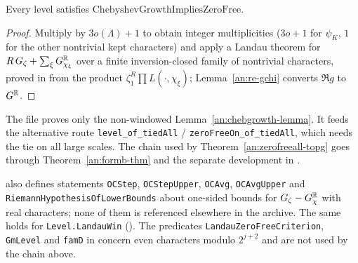 \begin{lemma}\label{an:chebgrowth-lemma}
Every level satisfies $\mathrm{ChebyshevGrowthImpliesZeroFree}$.
\end{lemma}
\begin{proof}
Multiply by $3o(\Lambda)+1$ to obtain integer multiplicities ($3o+1$ for
$\psi_K$, $1$ for the other nontrivial kept characters) and apply a
Landau theorem for $R\,G_{\zeta}+\sum_{\xi} G^{\mathbb{R}}_{\chi_{\xi}}$ over a finite
inversion-closed family of nontrivial characters, proved in
from the product $\zeta_1^R\prod L(\cdot,\chi_{\xi})$; Lemma~\ref{an:re-gchi}
converts $\Re g$ to $G^{\mathbb{R}}$.
\end{proof}

\begin{remark}\label{an:rem-landaufile}
The file  proves only the
non-windowed Lemma~\ref{an:chebgrowth-lemma}. It feeds the alternative
route \texttt{level\_of\_tiedAll} / \texttt{zeroFreeOn\_of\_tiedAll},
which needs the tie on all large scales. The chain used by
Theorem~\ref{an:zerofreeall-topg} goes through Theorem~\ref{an:formb-thm}
and the separate development in .
\end{remark}

\begin{remark}\label{an:rem-unused}
 also defines statements
\texttt{OCStep}, \texttt{OCStepUpper}, \texttt{OCAvg}, \texttt{OCAvgUpper}
and \texttt{RiemannHypothesisOfLowerBounds} about one-sided bounds for
$G_{\zeta}-G^{\mathbb{R}}_{\chi}$ with real characters; none of them is referenced
elsewhere in the archive. The same holds for \texttt{Level.LandauWin}
(). The predicates
\texttt{LandauZeroFreeCriterion}, \texttt{GmLevel} and \texttt{famD} in
 concern even
characters modulo $2^{j+2}$ and are not used by the chain above.
\end{remark}
